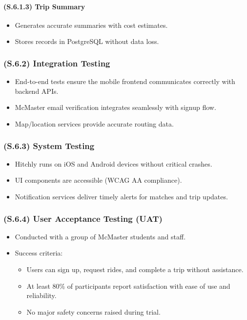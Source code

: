 \documentclass[12pt,letterpaper]{article}
\begin{document}
\paragraph{(S.6.1.3) Trip Summary} %
\begin{itemize}
    \item Generates accurate summaries with cost estimates.
    \item Stores records in PostgreSQL without data loss.
\end{itemize}

\subsubsection{(S.6.2) Integration Testing} %
\begin{itemize}
    \item End-to-end tests ensure the mobile frontend communicates correctly with backend APIs.
    \item McMaster email verification integrates seamlessly with signup flow.
    \item Map/location services provide accurate routing data.
\end{itemize}

\subsubsection{(S.6.3) System Testing} %
\begin{itemize}
    \item Hitchly runs on iOS and Android devices without critical crashes.
    \item UI components are accessible (WCAG AA compliance).
    \item Notification services deliver timely alerts for matches and trip updates.
\end{itemize}

\subsubsection{(S.6.4) User Acceptance Testing (UAT)} %
\begin{itemize}
    \item Conducted with a group of McMaster students and staff.
    \item Success criteria:
    \begin{itemize}
        \item Users can sign up, request rides, and complete a trip without assistance.
        \item At least 80\% of participants report satisfaction with ease of use and reliability.
        \item No major safety concerns raised during trial.
    \end{itemize}
\end{itemize}
\end{document}
